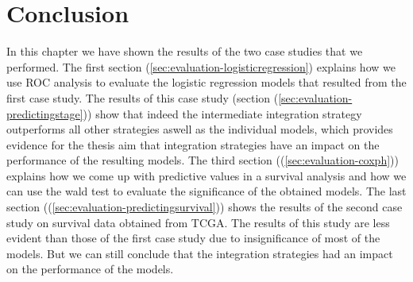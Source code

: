 \section{Conclusion}
\label{sec:evaluation-conclusion}
In this chapter we have shown the results of the two case studies that we performed. The first section (\ref{sec:evaluation-logisticregression}) explains how we use ROC analysis to evaluate the logistic regression models that resulted from the first case study. The results of this case study (section (\ref{sec:evaluation-predictingstage})) show that indeed the intermediate integration strategy outperforms all other strategies aswell as the individual models, which provides evidence for the thesis aim that integration strategies have an impact on the performance of the resulting models. The third section ((\ref{sec:evaluation-coxph})) explains how we come up with predictive values in a survival analysis and how we can use the wald test to evaluate the significance of the obtained models. The last section ((\ref{sec:evaluation-predictingsurvival})) shows the results of the second case study on survival data obtained from TCGA. The results of this study are less evident than those of the first case study due to insignificance of most of the models. But we can still conclude that the integration strategies had an impact on the performance of the models.
